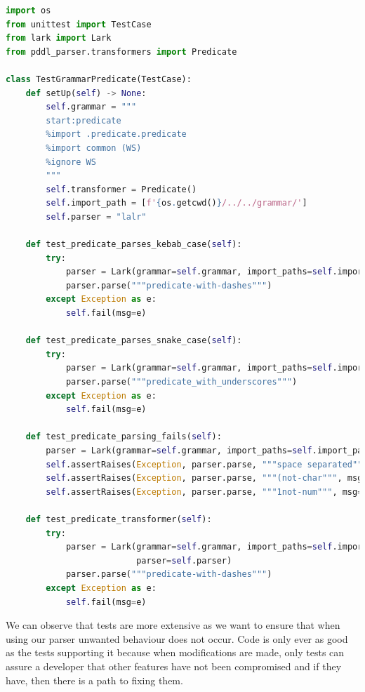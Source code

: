 \newpage
\begin{lstlisting}[language=Python]
import os
from unittest import TestCase
from lark import Lark
from pddl_parser.transformers import Predicate

class TestGrammarPredicate(TestCase):
    def setUp(self) -> None:
        self.grammar = """
        start:predicate
        %import .predicate.predicate
        %import common (WS)
        %ignore WS
        """
        self.transformer = Predicate()
        self.import_path = [f'{os.getcwd()}/../../grammar/']
        self.parser = "lalr"

    def test_predicate_parses_kebab_case(self):
        try:
            parser = Lark(grammar=self.grammar, import_paths=self.import_path, parser=self.parser)
            parser.parse("""predicate-with-dashes""")
        except Exception as e:
            self.fail(msg=e)

    def test_predicate_parses_snake_case(self):
        try:
            parser = Lark(grammar=self.grammar, import_paths=self.import_path, parser=self.parser)
            parser.parse("""predicate_with_underscores""")
        except Exception as e:
            self.fail(msg=e)

    def test_predicate_parsing_fails(self):
        parser = Lark(grammar=self.grammar, import_paths=self.import_path, parser=self.parser)
        self.assertRaises(Exception, parser.parse, """space separated""", msg='failed to raise on space separator')
        self.assertRaises(Exception, parser.parse, """(not-char""", msg='failed to raise on non char in word')
        self.assertRaises(Exception, parser.parse, """1not-num""", msg='failed to raise on num in word')

    def test_predicate_transformer(self):
        try:
            parser = Lark(grammar=self.grammar, import_paths=self.import_path, transformer=self.transformer,
                          parser=self.parser)
            parser.parse("""predicate-with-dashes""")
        except Exception as e:
            self.fail(msg=e)
\end{lstlisting}
We can observe that tests are more extensive as we want to ensure that when using our parser unwanted behaviour does not occur. Code is only ever as good as the tests supporting it because when modifications are made, only tests can assure a developer that other features have not been compromised and if they have, then there is a path to fixing them. 
\newpage
